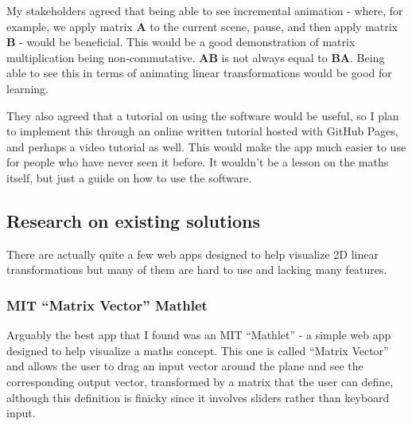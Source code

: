 \documentclass[../main.tex]{subfiles}
\begin{document}
My stakeholders agreed that being able to see incremental animation - where, for example, we apply matrix $\mathbf{A}$ to the current scene, pause, and then apply matrix $\mathbf{B}$ - would be beneficial. This would be a good demonstration of matrix multiplication being non-commutative. $\mathbf{AB}$ is not always equal to $\mathbf{BA}$. Being able to see this in terms of animating linear transformations would be good for learning.

They also agreed that a tutorial on using the software would be useful, so I plan to implement this through an online written tutorial hosted with GitHub Pages, and perhaps a video tutorial as well. This would make the app much easier to use for people who have never seen it before. It wouldn't be a lesson on the maths itself, but just a guide on how to use the software.

\subsection{Research on existing solutions\label{analysis:research-on-existing-solutions}}

There are actually quite a few web apps designed to help visualize 2D linear transformations but many of them are hard to use and lacking many features.

\subsubsection{MIT \enquote{Matrix Vector} Mathlet\label{analysis:research-on-existing-solutions:mit-mathlet-matrix-vector}}

Arguably the best app that I found was an MIT \enquote{Mathlet} - a simple web app designed to help visualize a maths concept. This one is called \enquote{Matrix Vector}\cite{mit-mathlet-matrix-vector} and allows the user to drag an input vector around the plane and see the corresponding output vector, transformed by a matrix that the user can define, although this definition is finicky since it involves sliders rather than keyboard input.

\end{document}

